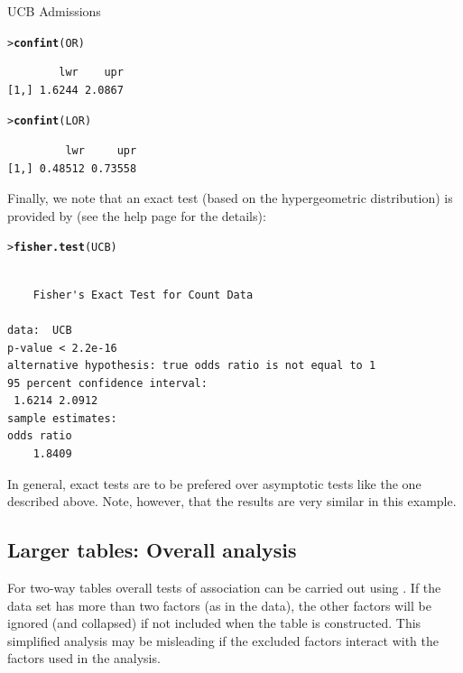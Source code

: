 \documentclass[10pt,krantz2]{krantz}\usepackage[]{graphicx}\usepackage[]{color}
\makeatletter
\newcommand{\hlstd}[1]{\textcolor[rgb]{0.345,0.345,0.345}{#1}}%
\newcommand{\hlkwd}[1]{\textcolor[rgb]{0.737,0.353,0.396}{\textbf{#1}}}%
\newenvironment{kframe}{%
 \def\at@end@of@kframe{}%
 \ifinner\ifhmode%
  \def\at@end@of@kframe{\end{minipage}}%
  \begin{minipage}{\columnwidth}%
 \fi\fi%
 \def\FrameCommand##1{\hskip\@totalleftmargin \hskip-\fboxsep
 \colorbox{shadecolor}{##1}\hskip-\fboxsep
     \hskip-\linewidth \hskip-\@totalleftmargin \hskip\columnwidth}%
 \MakeFramed {\advance\hsize-\width
   \@totalleftmargin\z@ \linewidth\hsize
   \@setminipage}}%
 {\par\unskip\endMakeFramed%
 \at@end@of@kframe}
\newenvironment{knitrout}{}{} %
\renewenvironment{knitrout}{\small\renewcommand{\baselinestretch}{.85}}{} %
\makeatother
\begin{document}
\begin{Example}[ucbadmissions]{UCB Admissions}
\begin{knitrout}
\begin{kframe}
\begin{alltt}
\hlstd{> }\hlkwd{confint}\hlstd{(OR)}
\end{alltt}
\begin{verbatim}
        lwr    upr
[1,] 1.6244 2.0867
\end{verbatim}
\begin{alltt}
\hlstd{> }\hlkwd{confint}\hlstd{(LOR)}
\end{alltt}
\begin{verbatim}
         lwr     upr
[1,] 0.48512 0.73558
\end{verbatim}
\end{kframe}
\end{knitrout}
\noindent Finally, we note that an exact test (based on the
hypergeometric distribution) is provided by
 (see the help page for the details):
\begin{knitrout}
\color{fgcolor}\begin{kframe}
\begin{alltt}
\hlstd{> }\hlkwd{fisher.test}\hlstd{(UCB)}
\end{alltt}
\begin{verbatim}

	Fisher's Exact Test for Count Data

data:  UCB
p-value < 2.2e-16
alternative hypothesis: true odds ratio is not equal to 1
95 percent confidence interval:
 1.6214 2.0912
sample estimates:
odds ratio 
    1.8409 
\end{verbatim}
\end{kframe}
\end{knitrout}
\noindent In general, exact tests are to be prefered over asymptotic tests
like the one described above. Note, however, that the results are very
similar in this example.
\end{Example} 

\subsection{Larger tables: Overall analysis}\label{sec:twoway-overall}

For two-way tables overall tests of association can be carried out
using .
If the data set has more than two factors (as in the
 data), the other factors will be
ignored (and collapsed) if not included when the table is constructed.
This simplified analysis may be misleading if
the excluded factors interact with the factors used in the
analysis.
\end{document}
